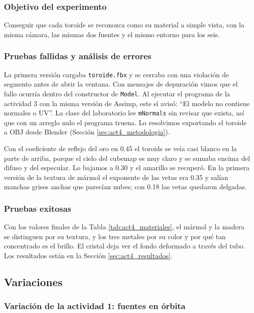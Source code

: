 \subsubsection{Objetivo del experimento}

Conseguir que cada toroide se reconozca como su material a simple vista, con la misma cámara, las mismas dos fuentes y el mismo entorno para los seis.

\subsubsection{Pruebas fallidas y análisis de errores}

La primera versión cargaba \texttt{toroide.fbx} y se cerraba con una violación de segmento antes de abrir la ventana. Con mensajes de depuración vimos que el fallo ocurría dentro del constructor de \texttt{Model}. Al ejecutar el programa de la actividad 3 con la misma versión de Assimp, este sí avisó: ``El modelo no contiene normales o UV''. La clase del laboratorio lee \texttt{mNormals} sin revisar que exista, así que con un arreglo nulo el programa truena. Lo resolvimos exportando el toroide a OBJ desde Blender (Sección \ref{sec:act4_metodologia}).


Con el coeficiente de reflejo del oro en 0.45 el toroide se veía casi blanco en la parte de arriba, porque el cielo del cubemap es muy claro y se sumaba encima del difuso y del especular. Lo bajamos a 0.30 y el amarillo se recuperó. En la primera versión de la textura de mármol el exponente de las vetas era 0.35 y salían manchas grises anchas que parecían nubes; con 0.18 las vetas quedaron delgadas.

\subsubsection{Pruebas exitosas}

Con los valores finales de la Tabla \ref{tab:act4_materiales}, el mármol y la madera se distinguen por su textura, y los tres metales por su color y por qué tan concentrado es el brillo. El cristal deja ver el fondo deformado a través del tubo. Los resultados están en la Sección \ref{sec:act4_resultados}.

\subsection{Variaciones}
\label{sec:var_experimentos}

\subsubsection{Variación de la actividad 1: fuentes en órbita}

